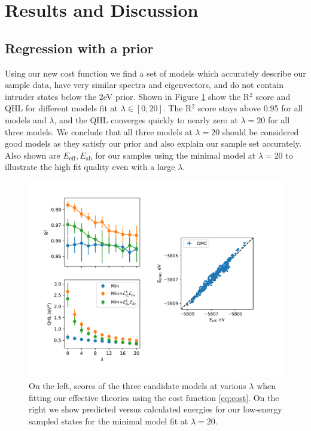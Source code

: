 \documentclass{article}
\begin{document}
\section{Results and Discussion}
\subsection{Regression with a prior}
Using our new cost function we find a set of models which accurately describe our sample data, have very similar spectra and eigenvectors, and do not contain intruder states below the 2eV prior. 
Shown in Figure \ref{fig:Prior} show the R$^2$ score and QHL for different models fit at $\lambda \in [0,20]$. 
The R$^2$ score stays above 0.95 for all models and $\lambda$, and the QHL converges quickly to nearly zero at $\lambda = 20$ for all three models. 
We conclude that all three models at $\lambda = 20$ should be considered good models as they satisfy our prior and also explain our sample set accurately. 
Also shown are $E_\text{eff}, E_\text{ab}$ for our samples using the minimal model at $\lambda = 20$ to illustrate the high fit quality even with a large $\lambda$.

\begin{figure}[H]
\centering
\includegraphics[width=0.7\linewidth]{../qwalk/old/ub3lyp_s1_/analysis/figs/prior_and_regr.pdf}
\caption{On the left, scores of the three candidate models at various $\lambda$ when fitting our effective theories using the cost function \eqref{eq:cost}. On the right we show predicted versus calculated energies for our low-energy sampled states for the minimal model fit at $\lambda = 20$.}
\label{fig:Prior}
\end{figure}
\end{document}

